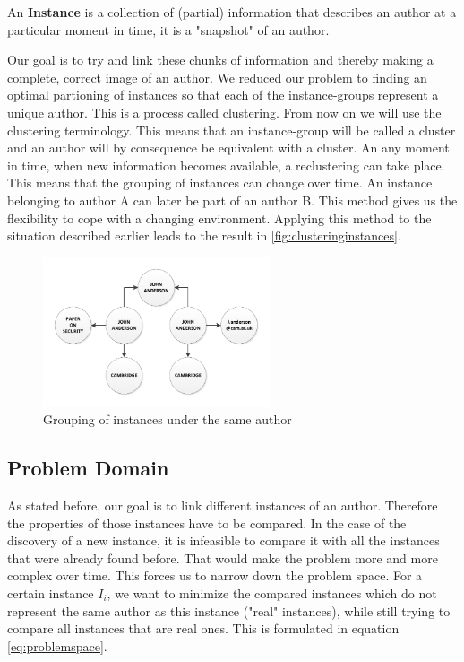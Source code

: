 \begin{mydef}
An \textbf{Instance} is a collection of (partial) information that describes an author at a particular moment in time, it is a "snapshot" of an author.
\end{mydef}

Our goal is to try and link these chunks of information and thereby making a complete, correct image of an author. We reduced our problem to finding an optimal partioning of instances so that each of the instance-groups represent a unique author. This is a process called clustering. From now on we will use the clustering terminology. This means that an instance-group will be called a cluster and an author will by consequence be equivalent with a cluster. An any moment in time, when new information becomes available, a reclustering can take place. This means that the grouping of instances can change over time. An instance belonging to author A can later be part of an author B. This method gives us the flexibility to cope with a changing environment. Applying this method to the situation described earlier leads to the result in \autoref{fig:clusteringinstances}.

\begin{figure}[htb]
	\centering
		\includegraphics[width=0.6\textwidth]{fig/clusteringinstances}
	\caption{Grouping of instances under the same author}
	\label{fig:clusteringinstances}
\end{figure}

\subsection{Problem Domain}
\label{problemdomain}

As stated before, our goal is to link different instances of an author. Therefore the properties of those instances have to be compared. In the case of the discovery of a new instance, it is infeasible to compare it with all the instances that were already found before. That would make the problem more and more complex over time. This forces us to narrow down the problem space. For a certain instance $I_i$, we want to minimize the compared instances which do not represent the same author as this instance ("real" instances), while still trying to compare all instances that are real ones. This is formulated in equation \autoref{eq:problemspace}.

